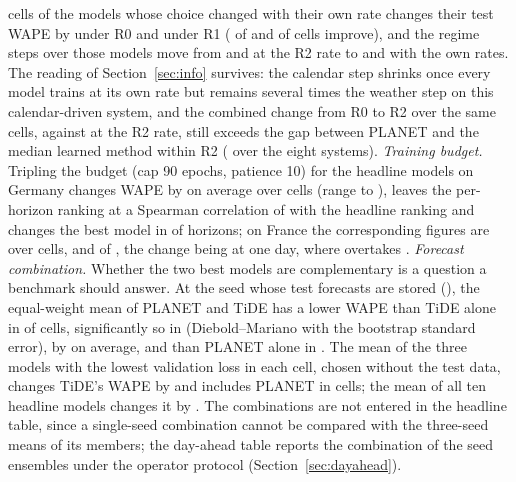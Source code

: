 cells of the models whose choice changed with their own rate changes their test WAPE by
 under R0 and  under
R1 ( of  and
 of  cells improve), and the regime
steps over those models move from  and
 at the R2 rate to
 and
 with the own rates. The reading of
Section~\ref{sec:info} survives: the calendar step shrinks once every model trains at its own
rate but remains several times the weather step on this calendar-driven system, and the
combined change from R0 to R2 over the same cells,
 against
 at the R2 rate, still exceeds the gap between
PLANET and the median learned method within R2 ( over the eight
systems).
\emph{Training budget.} Tripling the budget (cap 90 epochs, patience 10) for the headline
models on Germany changes WAPE by  on average over
 cells (range  to
), leaves the per-horizon ranking at a Spearman correlation of
 with the headline ranking and changes the best model in
 of  horizons; on France the
corresponding figures are  over 
cells,  and  of
, the change being at one day, where
 overtakes .
\emph{Forecast combination.} Whether the two best models are complementary is a question a
benchmark should answer. At the seed whose test forecasts are stored (), the
equal-weight mean of PLANET and TiDE has a lower WAPE than TiDE alone in
 of  cells, significantly so in
 (Diebold--Mariano with the bootstrap standard error),
by  on average, and than PLANET alone in
. The mean of the three models with the lowest validation
loss in each cell, chosen without the test data, changes TiDE's WAPE by
 and includes PLANET in
 cells; the mean of all ten headline models changes
it by . The combinations are not entered in the
headline table, since a single-seed combination cannot be compared with the three-seed means
of its members; the day-ahead table reports the combination of the seed ensembles under the
operator protocol (Section~\ref{sec:dayahead}).

